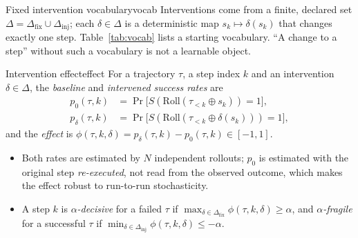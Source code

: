 \begin{assumption}{Fixed intervention vocabulary}{vocab}
Interventions come from a finite, declared set $\Delta=\Delta_{\mathrm{fix}}\cup\Delta_{\mathrm{inj}}$; each $\delta\in\Delta$ is a deterministic map $s_k\mapsto\delta(s_k)$ that changes exactly one step. Table~\ref{tab:vocab} lists a starting vocabulary. ``A change to a step'' without such a vocabulary is not a learnable object.
\end{assumption}

\begin{definition}{Intervention effect}{effect}
For a trajectory $\tau$, a step index $k$ and an intervention $\delta\in\Delta$, the \emph{baseline} and \emph{intervened success rates} are
\begin{align*}
p_0(\tau,k)&=\Pr\big[S(\mathrm{Roll}(\tau_{<k}\oplus s_k))=1\big],\\
p_\delta(\tau,k)&=\Pr\big[S(\mathrm{Roll}(\tau_{<k}\oplus\delta(s_k)))=1\big],
\end{align*}
and the \emph{effect} is $\phi(\tau,k,\delta)=p_\delta(\tau,k)-p_0(\tau,k)\in[-1,1]$.
\begin{itemize}[leftmargin=1.1em]
\item Both rates are estimated by $N$ independent rollouts; $p_0$ is estimated with the original step \emph{re-executed}, not read from the observed outcome, which makes the effect robust to run-to-run stochasticity.
\item A step $k$ is \emph{$\alpha$-decisive} for a failed $\tau$ if $\max_{\delta\in\Delta_{\mathrm{fix}}}\phi(\tau,k,\delta)\ge\alpha$, and \emph{$\alpha$-fragile} for a successful $\tau$ if $\min_{\delta\in\Delta_{\mathrm{inj}}}\phi(\tau,k,\delta)\le-\alpha$.
\end{itemize}
\end{definition}


